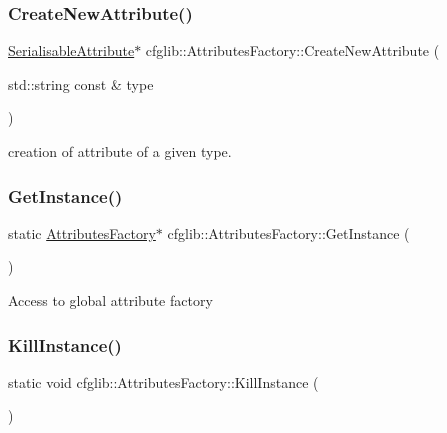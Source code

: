 \subsubsection{\texorpdfstring{Create\+New\+Attribute()}{CreateNewAttribute()}}
{\footnotesize\ttfamily \hyperlink{classcfglib_1_1SerialisableAttribute}{Serialisable\+Attribute}$\ast$ cfglib\+::\+Attributes\+Factory\+::\+Create\+New\+Attribute (\begin{DoxyParamCaption}\item[{std\+::string const \&}]{type }\end{DoxyParamCaption})}

creation of attribute of a given type. \mbox{\label{classcfglib_1_1AttributesFactory_a467b197e6a1dbbdcece13c93766a19ee}} 
\subsubsection{\texorpdfstring{Get\+Instance()}{GetInstance()}}
{\footnotesize\ttfamily static \hyperlink{classcfglib_1_1AttributesFactory}{Attributes\+Factory}$\ast$ cfglib\+::\+Attributes\+Factory\+::\+Get\+Instance (\begin{DoxyParamCaption}{ }\end{DoxyParamCaption})\hspace{0.3cm}{\ttfamily [static]}}

Access to global attribute factory \mbox{\label{classcfglib_1_1AttributesFactory_a3a1adf8be0c0115a191837d6c085c928}} 
\subsubsection{\texorpdfstring{Kill\+Instance()}{KillInstance()}}
{\footnotesize\ttfamily static void cfglib\+::\+Attributes\+Factory\+::\+Kill\+Instance (\begin{DoxyParamCaption}{ }\end{DoxyParamCaption})\hspace{0.3cm}{\ttfamily [static]}}

